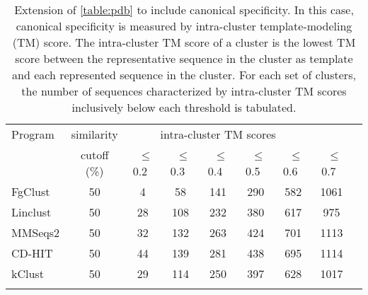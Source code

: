 \documentclass{bioinfo}
\begin{document}
\begin{table}%
	\centering
	\caption{
		Extension of \cref{table:pdb} to include canonical specificity.
		In this case, canonical specificity is measured by intra-cluster template-modeling (TM) score.
		The intra-cluster TM score of a cluster is the lowest TM score between the representative sequence in the cluster as template and each represented sequence in the cluster.
		For each set of clusters, the number of sequences characterized by intra-cluster TM scores inclusively below each threshold is tabulated.
	}
	\begin{tabular}{l c c c c c c c c}
		\toprule
		Program & similarity & 
		\multicolumn{5}{c}{intra-cluster TM scores} \\
		& cutoff (\%)     & ~\(\le\)0.2~ &
		~\(\le\)0.3~ & ~\(\le\)0.4~ & ~\(\le\)0.5~ 
		& ~\(\le\)0.6~ & ~\(\le\)0.7~ %
		\\
		\midrule
		
		FgClust & 50 & 4 & 58 & 141 & 290 & 582 & 1061 \\
		
		Linclust & 50 & 28 & 108 & 232 & 380 & 617 &  975 \\ %
		MMSeqs2  & 50 & 32 & 132 & 263 & 424 & 701 & 1113 \\ %
		CD-HIT   & 50 & 44 & 139 & 281 & 438 & 695 & 1114 \\ %
		kClust   & 50 & 29 & 114 & 250 & 397 & 628 & 1017 \\ %
		\noalign{\vskip 2mm} 


\end{tabular}
\end{table}
\end{document}
